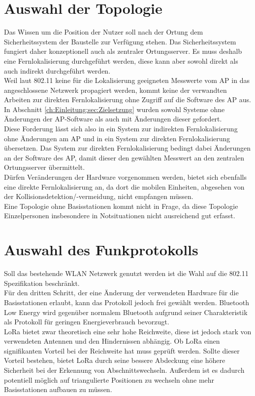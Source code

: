 \section{Auswahl der Topologie}
Das Wissen um die Position der Nutzer soll nach der Ortung dem Sicherheitssystem der Baustelle zur Verfügung stehen. 
Das Sicherheitssystem fungiert daher konzeptionell auch als zentraler Ortungsserver.
Es muss deshalb eine Fernlokalisierung durchgeführt werden, diese kann aber sowohl direkt als auch indirekt durchgeführt werden. \\
Weil laut 802.11 keine für die Lokalisierung geeigneten Messwerte vom AP in das angeschlossene Netzwerk propagiert werden, kommt keine der verwandten Arbeiten zur direkten Fernlokalisierung ohne Zugriff auf die Software des AP aus.
In Abschnitt \ref{ch:Einleitung:sec:Zielsetzung} wurden sowohl Systeme ohne Änderungen der AP-Software als auch mit Änderungen dieser gefordert. \\
Diese Forderung lässt sich also in ein System zur indirekten Fernlokalisierung ohne Änderungen am AP und in ein System zur direkten Fernlokalisierung übersetzen.
Das System zur direkten Fernlokalisierung bedingt dabei Änderungen an der Software des AP, damit dieser den gewählten Messwert an den zentralen Ortungsserver übermittelt.\\
Dürfen Veränderungen der Hardware vorgenommen werden, bietet sich ebenfalls eine direkte Fernlokalisierung an, da dort die mobilen Einheiten, abgesehen von der Kollisionsdetektion/-vermeidung, nicht empfangen müssen.\\
Eine Topologie ohne Basisstationen kommt nicht in Frage, da diese Topologie Einzelpersonen insbesondere in Notsituationen nicht ausreichend gut erfasst.

\section{Auswahl des Funkprotokolls}
Soll das bestehende WLAN Netzwerk genutzt werden ist die Wahl auf die 802.11 Spezifikation beschränkt.\\
Für den dritten Schritt, der eine Änderung der verwendeten Hardware für die Basisstationen erlaubt, kann das Protokoll jedoch frei gewählt werden.
Bluetooth Low Energy wird gegenüber normalem Bluetooth aufgrund seiner Charakteristik als Protokoll für geringen Energieverbrauch bevorzugt.\\
LoRa bietet zwar theoretisch eine sehr hohe Reichweite, diese ist jedoch stark von verwendeten Antennen und den Hindernissen abhängig.
Ob LoRa einen signifikanten Vorteil bei der Reichweite hat muss geprüft werden.
Sollte dieser Vorteil bestehen, bietet LoRa durch seine bessere Abdeckung eine höhere Sicherheit bei der Erkennung von Abschnittswechseln. 
Außerdem ist es dadurch potentiell möglich auf triangulierte Positionen zu wechseln ohne mehr Basisstationen aufbauen zu müssen.


